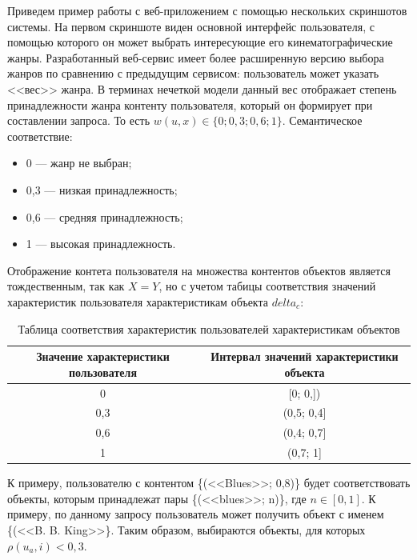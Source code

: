 Приведем пример работы с веб-приложением с помощью нескольких скриншотов системы.
На первом скриншоте виден основной интерфейс пользователя, с помощью которого
он может выбрать интересующие его кинематографические жанры. Разработанный веб-сервис
имеет более расширенную версию выбора жанров по сравнению с предыдущим сервисом:
пользователь может указать <<вес>> жанра. В терминах нечеткой модели данный вес
отображает степень принадлежности жанра контенту пользователя, который он формирует
при составлении запроса. То есть $w(u,x) \in \{0; 0,3; 0,6; 1\}$. Семантическое соответствие:
\begin{itemize}
\item 0 --- жанр не выбран;
\item 0,3 --- низкая принадлежность;
\item 0,6 --- средняя принадлежность;
\item 1 --- высокая принадлежность.
\end{itemize}
Отображение контета пользователя на множества контентов объектов является тождественным, так как $X = Y$,
но с учетом табицы соответствия значений характеристик пользователя характеристикам объекта $delta_c$:
\begin{table}[h]
\caption{Таблица соответствия характеристик пользователей характеристикам объектов}
\begin{tabular}{|c|c|}
  \hline
  Значение характеристики пользователя & Интервал значений характеристики объекта \\ \hline
  0   & [0; 0,]) \\ \hline
  0,3 &  (0,5; 0,4] \\ \hline
  0,6 & (0,4; 0,7] \\ \hline
  1 & (0,7; 1] \\ \hline
\end{tabular}
\end{table}
К примеру, пользователю с контентом \{(<<Blues>>; 0,8)\} будет
соответствовать объекты, которым принадлежат пары \{(<<blues>>; n)\}, где
$n \in [0,1]$. К примеру, по данному запросу пользователь может получить объект
с именем \{(<<B. B. King>>\}. Таким образом, выбираются объекты,
для которых $\rho(u_a, i) < 0,3$.


